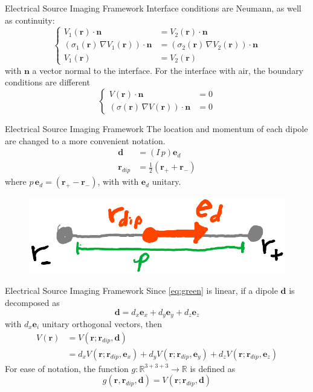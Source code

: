 \documentclass[progressbar=head]{beamer}
\newcommand{\ppar}[1]{ \left( #1 \right) }
\newcommand{\R}{\mathbb{R}}
\newcommand{\rr}{\mathbf{r}}
\begin{document}
\begin{frame}{Electrical Source Imaging Framework}
Interface conditions are Neumann, as well as continuity:
\begin{equation}
\left\{
\begin{array}{rl}
    V_1(\rr) \cdot \mathbf{n} &= V_2(\rr) \cdot \mathbf{n} \\
    \ppar{\sigma_1(\rr)\, \nabla V_1(\rr)}\cdot \mathbf{n} &= 
    \ppar{\sigma_2(\rr)\, \nabla V_2(\rr)}\cdot \mathbf{n} \\
    V_1(\rr) &= V_2(\rr)
\end{array}
\right.
\end{equation}
with $\mathbf{n}$ a vector normal to the interface.
For the interface with air, the boundary conditions are different
\begin{equation}
\left\{
\begin{array}{rl}
    V(\rr) \cdot \mathbf{n} &= 0 \\
    \ppar{\sigma(\rr)\, \nabla V(\rr)}\cdot \mathbf{n} &= 0
\end{array}
\right.
\end{equation}    
\end{frame}

\begin{frame}{Electrical Source Imaging Framework}
The location and momentum of each dipole are changed to a more convenient notation.
\begin{align}
\mathbf{d} &= \ppar{I\, p} \mathbf{e}_d \\
\rr_{dip} &= \frac{1}{2}\ppar{\rr_++\rr_-}
\end{align}
where 
$p\, \mathbf{e}_d = \ppar{\rr_+-\rr_-}$, with
with $\mathbf{e}_d$ unitary.
\begin{figure}
\centering
\includegraphics[width=0.4\linewidth]{./img_oldbeamer/sketch05}
\end{figure}
\end{frame}

\begin{frame}{Electrical Source Imaging Framework}
%
Since \eqref{eq:green} is linear, if a dipole $\mathbf{d}$ is decomposed as 
\begin{equation}
\mathbf{d} = d_x \mathbf{e}_x + d_y \mathbf{e}_y + d_z \mathbf{e}_z    
\end{equation}
with $d_x \mathbf{e}_i$ unitary orthogonal vectors, then
\begin{align}
V\ppar{\rr} &=
V\ppar{\rr; \rr_{dip}, \mathbf{d}} 
\nonumber \\
&=
d_x V\ppar{\rr; \rr_{dip}, \mathbf{e}_x} +
d_y V\ppar{\rr; \rr_{dip}, \mathbf{e}_y} +
d_z V\ppar{\rr; \rr_{dip}, \mathbf{e}_z}
\end{align}
For ease of notation, the function $g: \R^{3+3+3}\rightarrow \R$ is defined as
\begin{equation}
    g\ppar{\rr, \rr_{dip}, \mathbf{d}} = V\ppar{\rr; \rr_{dip}, \mathbf{d}}
\end{equation}
\end{frame}
\end{document}
